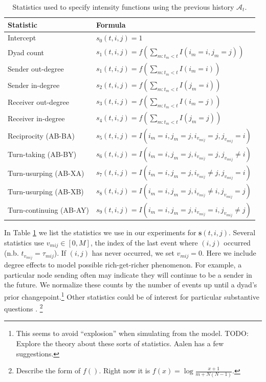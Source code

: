 \documentclass{article}
\begin{document}
\begin{table}[t]
\footnotesize
\center
\begin{tabular}{|l|l|}
\hline
Statistic & Formula \\
\hline
\hline
Intercept& $s_{0}(t,i,j) = 1$\\
Dyad count& $s_{1}(t,i,j) = f(\sum_{m:t_m<t} I(i_m=i,j_m=j) )$\\
Sender out-degree& $s_{1}(t,i,j) = f(\sum_{m:t_m<t} I(i_m=i) )$\\
Sender in-degree& $s_{2}(t,i,j) = f(\sum_{m:t_m<t} I(j_m=i) )$\\
Receiver out-degree& $s_{3}(t,i,j) = f(\sum_{m:t_m<t} I(i_m=j))$\\
Receiver in-degree& $s_{4}(t,i,j) = f(\sum_{m:t_m<t} I(j_m=j))$\\
Reciprocity (AB-BA)& $s_{5}(t,i,j) = I(i_m=i,j_m=j,i_{v_{mij}}=j,j_{v_{mij}}=i)$\\
Turn-taking (AB-BY)&$s_{6}(t,i,j) = I(i_m=i,j_m=j,i_{v_{mij}}=j,j_{v_{mij}}\ne i)$\\
Turn-usurping (AB-XA)& $s_{7}(t,i,j) = I(i_m=i,j_m=j,i_{v_{mij}} \ne j,j_{v_{mij}}=i)$\\
Turn-usurping (AB-XB)&$s_{8}(t,i,j) = I(i_m=i,j_m=j,i_{v_{mij}} \ne i,j_{v_{mij}}=j)$\\
Turn-continuing (AB-AY)& $s_{9}(t,i,j) =  I(i_m=i,j_m=j,i_{v_{mij}}=i,j_{v_{mij}}\ne j)$\\
\hline
\end{tabular}
\label{tab:stats}
\caption{Statistics used to specify intensity functions using the previous history $\mathcal{A}_t$.}
\end{table}



In Table \ref{tab:stats} we list the statistics we use in our experiments for  $\mathbf{s}(t,i,j)$.  Several statistics use $v_{mij} \in [0,M]$, the index of the last event where $(i,j)$ occurred (n.b. $t_{v_{mij}} = \tau_{mij}$). If $(i,j)$ has never occurred, we set $v_{mij}=0$.  Here we include degree effects to model possible rich-get-richer phenomenon.  For example, a particular node sending often may indicate they will continue to be a sender in the future.  We normalize these counts by the number of events up until a dyad's prior changepoint.\footnote{This seems to avoid ``explosion'' when simulating from the model.  TODO: Explore the theory about these sorts of statistics.  Aalen has a few suggestions.} Other statistics could be of interest for particular substantive questions \cite{Butts2008,Vu2011}.  \footnote{Describe the form of $f()$.  Right now it is $f(x) = \log \frac{x+1}{m + N(N-1)}$.}
\end{document}
